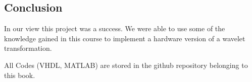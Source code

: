 \begin{refsection}
%









\section{Conclusion}

In our view this project was a success. We were able to use some of the knowledge gained in this course to implement a hardware version of a wavelet transformation.

All Codes (VHDL, MATLAB) are stored in the github repository belonging to this book. \cite{fpga:gitrepo-wavelets}

\printbibliography[heading=subbibliography]
\end{refsection}
